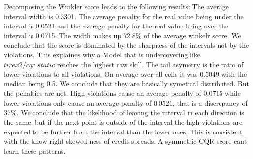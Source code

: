 Decomposing the Winkler score leads to the following results: The average interval width is 0.3301. The average penalty for the real value being under the interval is 0.0521 and the average penalty for the real value being over the interval is 0.0715. The width makes up $72.8\%$ of the average winkelr score. We conclude that the score is dominated by the sharpness of the intervals not by the violations. This explaines why a Model that is undercovering like $tirex2/cqr\_static$ reaches the highest raw skill. The tail asymetry is the ratio of lower violations to all violations. On average over all cells it was 0.5049 with the median being 0.5. We conclude that they are basically symetical distributed. But the penalties are not. High violations cause an average penalty of 0.0715 while lower violations only cause an average penalty of 0.0521, that is a discrepancy of 37$\%$. We conclude that the likelihood of leaving the interval in each direction is the same, but if the next point is outside of the interval the high violations are expected to be further from the interval than the lower ones. This is consistent with the know right skewed ness of credit spreads. A symmetric CQR score cant learn these patterns. 
